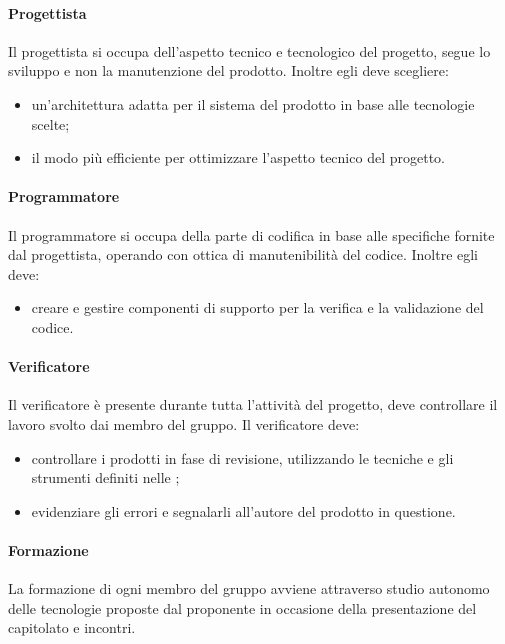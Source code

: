 \paragraph{Progettista}
Il progettista si occupa dell'aspetto tecnico e tecnologico del progetto, segue lo sviluppo e non la manutenzione del prodotto. Inoltre egli deve scegliere: 
\begin{itemize}
\item un'architettura adatta per il sistema del prodotto in base alle tecnologie scelte;
\item il modo più efficiente per ottimizzare l'aspetto tecnico del progetto.
\end{itemize}

\paragraph{Programmatore}
Il programmatore si occupa della parte di codifica in base alle specifiche fornite dal progettista, operando con ottica di manutenibilità del codice. Inoltre egli deve: 
\begin{itemize}
\item creare e gestire componenti di supporto per la verifica e la validazione del codice. 
\end{itemize}

\paragraph{Verificatore}
Il verificatore è presente durante tutta l'attività del progetto, deve controllare il lavoro svolto dai membro del gruppo. Il verificatore deve: 
\begin{itemize}
\item controllare i prodotti in fase di revisione, utilizzando le tecniche e gli strumenti definiti nelle \NdP{}; 
\item evidenziare gli errori e segnalarli all'autore del prodotto in questione.
\end{itemize}

\paragraph{Formazione}
La formazione di ogni membro del gruppo avviene attraverso studio autonomo delle tecnologie proposte dal proponente in occasione della presentazione del capitolato e incontri. 

